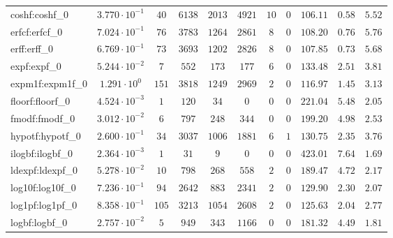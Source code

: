\begin{tabular}{|l|c|c|c|c|c|c|c|c|c|c|}
coshf:coshf\_0               & $ 3.770 \cdot 10^{-1} $ & $ 40     $ & $ 6138   $ & $ 2013  $ & $ 4921  $ & $ 10  $ & $ 0 $ & $ 106.11      $ & $ 0.58    $ & $ 5.52    $ \\
erfcf:erfcf\_0               & $ 7.024 \cdot 10^{-1} $ & $ 76     $ & $ 3783   $ & $ 1264  $ & $ 2861  $ & $ 8   $ & $ 0 $ & $ 108.20      $ & $ 0.76    $ & $ 5.76    $ \\
erff:erff\_0                 & $ 6.769 \cdot 10^{-1} $ & $ 73     $ & $ 3693   $ & $ 1202  $ & $ 2826  $ & $ 8   $ & $ 0 $ & $ 107.85      $ & $ 0.73    $ & $ 5.68    $ \\
expf:expf\_0                 & $ 5.244 \cdot 10^{-2} $ & $ 7      $ & $ 552    $ & $ 173   $ & $ 177   $ & $ 6   $ & $ 0 $ & $ 133.48      $ & $ 2.51    $ & $ 3.81    $ \\
expm1f:expm1f\_0             & $ 1.291 \cdot 10^{0}  $ & $ 151    $ & $ 3818   $ & $ 1249  $ & $ 2969  $ & $ 2   $ & $ 0 $ & $ 116.97      $ & $ 1.45    $ & $ 3.13    $ \\
floorf:floorf\_0             & $ 4.524 \cdot 10^{-3} $ & $ 1      $ & $ 120    $ & $ 34    $ & $ 0     $ & $ 0   $ & $ 0 $ & $ 221.04      $ & $ 5.48    $ & $ 2.05    $ \\
fmodf:fmodf\_0               & $ 3.012 \cdot 10^{-2} $ & $ 6      $ & $ 797    $ & $ 248   $ & $ 344   $ & $ 0   $ & $ 0 $ & $ 199.20      $ & $ 4.98    $ & $ 2.53    $ \\
hypotf:hypotf\_0             & $ 2.600 \cdot 10^{-1} $ & $ 34     $ & $ 3037   $ & $ 1006  $ & $ 1881  $ & $ 6   $ & $ 1 $ & $ 130.75      $ & $ 2.35    $ & $ 3.76    $ \\
ilogbf:ilogbf\_0             & $ 2.364 \cdot 10^{-3} $ & $ 1      $ & $ 31     $ & $ 9     $ & $ 0     $ & $ 0   $ & $ 0 $ & $ 423.01      $ & $ 7.64    $ & $ 1.69    $ \\
ldexpf:ldexpf\_0             & $ 5.278 \cdot 10^{-2} $ & $ 10     $ & $ 798    $ & $ 268   $ & $ 558   $ & $ 2   $ & $ 0 $ & $ 189.47      $ & $ 4.72    $ & $ 2.17    $ \\
log10f:log10f\_0             & $ 7.236 \cdot 10^{-1} $ & $ 94     $ & $ 2642   $ & $ 883   $ & $ 2341  $ & $ 2   $ & $ 0 $ & $ 129.90      $ & $ 2.30    $ & $ 2.07    $ \\
log1pf:log1pf\_0             & $ 8.358 \cdot 10^{-1} $ & $ 105    $ & $ 3213   $ & $ 1054  $ & $ 2608  $ & $ 2   $ & $ 0 $ & $ 125.63      $ & $ 2.04    $ & $ 2.77    $ \\
logbf:logbf\_0               & $ 2.757 \cdot 10^{-2} $ & $ 5      $ & $ 949    $ & $ 343   $ & $ 1166  $ & $ 0   $ & $ 0 $ & $ 181.32      $ & $ 4.49    $ & $ 1.81    $ \\

\end{tabular}

